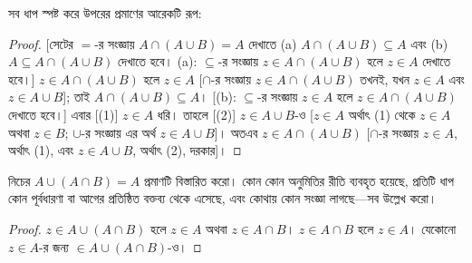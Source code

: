 \documentclass[../../../include/open-logic-section]{subfiles}
\begin{document}
সব ধাপ স্পষ্ট করে উপরের প্রমাণের আরেকটি রূপ:
\begin{proof}{}
[সেটের $=$-র সংজ্ঞায় $A \cap (A \cup B) = A$
  দেখাতে (a) $A \cap (A \cup B) \subseteq A$
  এবং (b) $A \subseteq A \cap (A \cup B)$
  দেখাতে হবে। (a): $\subseteq$-র সংজ্ঞায়
  $z \in A \cap (A \cup B)$ হলে $z \in A$
  দেখাতে হবে।] $z \in A \cap (A \cup B)$ হলে
  $z \in A$ [$\cap$-র সংজ্ঞায়
  $z \in A \cap (A \cup B)$ তখনই, যখন
  $z \in A$ এবং $z \in A \cup B$]; তাই
  $A \cap (A \cup B) \subseteq A$।
  [(b): $\subseteq$-র সংজ্ঞায় $z \in A$ হলে
  $z \in A \cap (A \cup B)$ দেখাতে হবে।]
  এবার [(1)] $z \in A$ ধরি। তাহলে
  [(2)] $z \in A \cup B$-ও [$z \in A$ অর্থাৎ
  (1) থেকে $z \in A$ অথবা $z \in B$;
  $\cup$-র সংজ্ঞায় এর অর্থ $z \in A \cup B$]।
  অতএব $z \in A \cap (A \cup B)$
  [$\cap$-র সংজ্ঞায় $z \in A$, অর্থাৎ (1),
  এবং $z \in A \cup B$, অর্থাৎ (2), দরকার]।
\end{proof}

\begin{prob}
নিচের $A \cup (A \cap B) = A$ প্রমাণটি বিস্তারিত
করো। কোন কোন অনুমিতির রীতি ব্যবহৃত হয়েছে,
প্রতিটি ধাপ কোন পূর্বধারণা বা আগের প্রতিষ্ঠিত
বক্তব্য থেকে এসেছে, এবং কোথায় কোন সংজ্ঞা
লাগছে—সব উল্লেখ করো।
\begin{proof}
  $z \in A \cup (A \cap B)$ হলে $z \in A$
  অথবা $z \in A \cap B$। $z \in A \cap B$
  হলে $z \in A$। যেকোনো $z \in A$-র জন্য
  $\in A \cup (A \cap B)$-ও।
\end{proof}
\end{prob}
\end{document}
